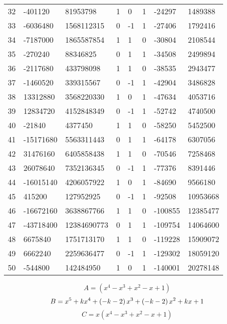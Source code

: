 \documentclass{amsart}
\begin{document}
\begin{longtable}{|l|l|l|lllll|}
32&-401120&81953798&1&0&1&-24297&1489388\\
33&-6036480&1568112315&0&-1&1&-27406&1792416\\
34&-7187000&1865587854&1&1&0&-30804&2108544\\
35&-270240&88346825&0&1&1&-34508&2499894\\
36&-2117680&433798098&1&1&0&-38535&2943477\\
37&-1460520&339315567&0&-1&1&-42904&3486828\\
38&13312880&3568220330&1&0&1&-47634&4053716\\
39&12834720&4152848349&0&-1&1&-52742&4740500\\
40&-21840&4377450&1&1&0&-58250&5452500\\
41&-15171680&5563311443&0&1&1&-64178&6307056\\
42&31476160&6405858438&1&1&0&-70546&7258468\\
43&26078640&7352136345&0&-1&1&-77376&8391446\\
44&-16015140&4206057922&1&0&1&-84690&9566180\\
45&415200&127952925&0&-1&1&-92508&10953668\\
46&-16672160&3638867766&1&1&0&-100855&12385477\\
47&-43718400&12384690773&0&1&1&-109754&14064600\\
48&6675840&1751713170&1&1&0&-119228&15909072\\
49&6662240&2259636477&0&-1&1&-129302&18059120\\
50&-544800&142484950&1&0&1&-140001&20278148\\
\hline
\end{longtable}
$$A=(x^4
 - x^3
 + x^2
 - x
 + 1)$$
$$B=x^5
 + k\*x^4
 + \left(-k
 - 2\right) \*x^3
 + \left(-k
 - 2\right) \*x^2
 + k\*x
 + 1$$
$$C=x(x^4
 - x^3
 + x^2
 - x
 + 1)$$
\end{document}
